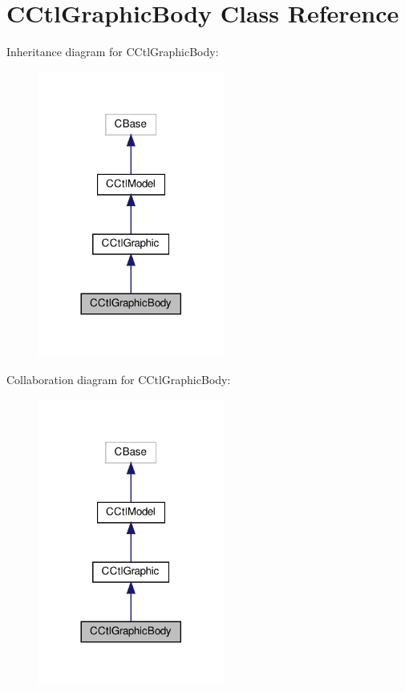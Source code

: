 \hypertarget{classCCtlGraphicBody}{}\section{C\+Ctl\+Graphic\+Body Class Reference}
\label{classCCtlGraphicBody}


Inheritance diagram for C\+Ctl\+Graphic\+Body\+:
\nopagebreak
\begin{figure}[H]
\begin{center}
\leavevmode
\includegraphics[width=173pt]{classCCtlGraphicBody__inherit__graph}
\end{center}
\end{figure}


Collaboration diagram for C\+Ctl\+Graphic\+Body\+:
\nopagebreak
\begin{figure}[H]
\begin{center}
\leavevmode
\includegraphics[width=173pt]{classCCtlGraphicBody__coll__graph}
\end{center}
\end{figure}
